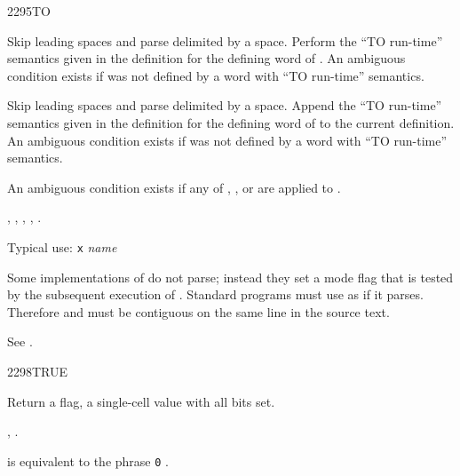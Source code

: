 \begin{worddef}{2295}{TO}
\interpret

	Skip leading spaces and parse  delimited by a space.
	Perform the ``TO  run-time'' semantics given in the
	definition for the defining word of .
	An ambiguous condition exists if  was not defined
	by a word with ``TO  run-time'' semantics.

\compile

	Skip leading spaces and parse  delimited by a
	space. Append the ``TO  run-time'' semantics given
	in the definition for the defining word	of  to the
	current definition.
	An ambiguous condition exists if  was not defined
	by a word with ``TO  run-time'' semantics.

\runtime
	\stack{}{}

\note
	An ambiguous condition exists if any of	,
	\word{[COMPILE]},  or \word{[']} are applied to
	.

\see {},
	,
	,
	,
	.

	\begin{rationale} %
		Typical use: \texttt{x}  \emph{name}

		Some implementations of  do not parse; instead they set
		a mode flag that is tested by the subsequent execution of
		.  Standard programs must use  as if it
		parses.  Therefore  and  must be
		contiguous  on the same line in the source text.
	\end{rationale}

	\begin{testing} %
		See .
	\end{testing}
\end{worddef}


\begin{worddef}{2298}{TRUE}
\item {}

	Return a  flag, a single-cell value with all
	bits set.

\see {},
	.

	\begin{rationale} %
		 is equivalent to the phrase
		\texttt{0} .
	\end{rationale}

	\begin{testing}
	 \\
	 \\
	\end{testing}
\end{worddef}


